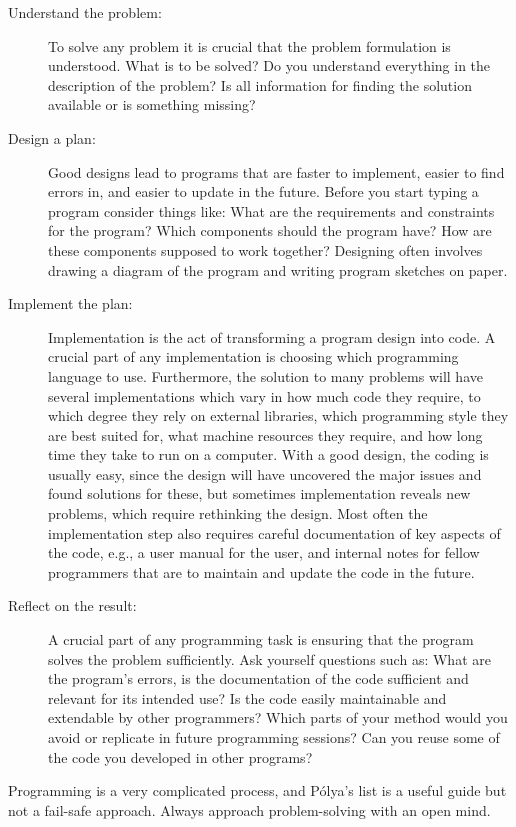 \documentclass[fsharpNotes.tex]{subfiles}
\begin{document}
\begin{description}
\item[Understand the problem:] To solve any problem it is crucial that the problem formulation is understood. What is to be solved? Do you understand everything in the description of the problem? Is all information for finding the solution available or is something missing?
\item[Design a plan:] Good designs lead to programs that are faster to implement, easier to find errors in, and easier to update in the future. Before you start typing a program consider things like: What are the requirements and constraints for the program? Which components should the program have? How are these components supposed to work together? Designing often involves drawing a diagram of the program and writing program sketches on paper.
\item[Implement the plan:] Implementation is the act of transforming a program design into code. A crucial part of any implementation is choosing which programming language to use. Furthermore, the solution to many problems will have several implementations which vary in how much code they require, to which degree they rely on external libraries, which programming style they are best suited for, what machine resources they require, and how long time they take to run on a computer.  With a good design, the coding is usually easy, since the design will have uncovered the major issues and found solutions for these, but sometimes implementation reveals new problems, which require rethinking the design. Most often the implementation step also requires careful documentation of key aspects of the code, e.g., a user manual for the user, and internal notes for fellow programmers that are to maintain and update the code in the future.
\item[Reflect on the result:] A crucial part of any programming task is ensuring that the program solves the problem sufficiently. Ask yourself questions such as: What are the program's errors, is the documentation of the code sufficient and relevant for its intended use? Is the code easily maintainable and extendable by other programmers? Which parts of your method would you avoid or replicate in future programming sessions? Can you reuse some of the code you developed in other programs?
\end{description}
Programming is a very complicated process, and Pólya's list is a useful guide but not a fail-safe approach. Always approach problem-solving with an open mind.
\end{document}
